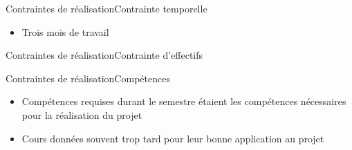 \begin{frame}{Contraintes de réalisation}{Contrainte temporelle}
\begin{itemize}
  \item Trois mois de travail
\end{itemize}
\end{frame}

\begin{frame}{Contraintes de réalisation}{Contrainte d'effectifs}

\end{frame}

\begin{frame}{Contraintes de réalisation}{Compétences}
\begin{itemize}
  \item Compétences requises durant le semestre étaient les compétences
  nécessaires pour la réalisation du projet
  \item Cours données souvent trop tard pour leur bonne application au projet
\end{itemize}

\end{frame}